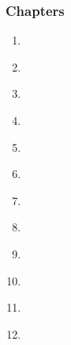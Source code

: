\begin{frame}[fragile,label=outline] 
\frametitle{Chapters}
\begin{center}
\begin{minipage}{3.25in}

\begin{enumerate}
\item \hyperlink{s-intro<1>}      {\BUTTON {\orow{\sIntro}}} \\
\item \hyperlink{s-present<1>}    {\BUTTON {\erow{\sPresent}}} \\
\item \hyperlink{s-recent<1>}     {\BUTTON {\erow{\sRecent}}} \\
\item \hyperlink{s-soon<1>}     {\BUTTON {\erow{\sSoon}}} \\
\item \hyperlink{s-future<1>}     {\BUTTON {\orow{\sFuture}}} \\
\item \hyperlink{s-project<1>}    {\BUTTON {\erow{\sProject}}} \\
\item \hyperlink{s-starting<1>}   {\BUTTON {\orow{\sStarting}}} \\
\item \hyperlink{s-parameters<1>} {\BUTTON {\erow{\sParameters}}} \\
\item \hyperlink{s-charm<1>}      {\BUTTON {\orow{\sCharm}}} \\
\item \hyperlink{s-design<1>}     {\BUTTON {\erow{\sDesign}}} \\
\item \hyperlink{s-control<1>}    {\BUTTON {\orow{\sControl}}} \\
\item \hyperlink{s-devel<1>}      {\BUTTON {\erow{\sDevel}}}
\end{enumerate}
\end{minipage}
\end{center}
\end{frame}


  
  
  
  
  
  
  
  
  
  
  
  
  


